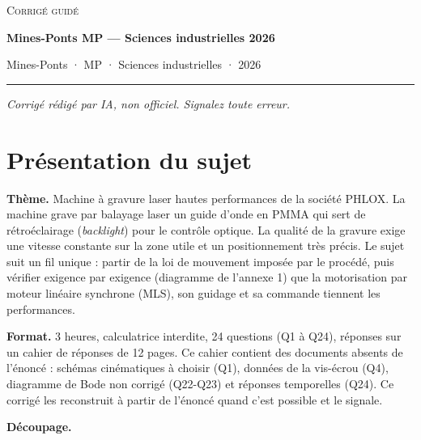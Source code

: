 \documentclass[11pt,a4paper]{article}
\begin{document}
\thispagestyle{plain}
\begin{center}
  {\small\scshape Corrigé guidé}\par\smallskip
  {\LARGE\bfseries Mines-Ponts MP — Sciences industrielles 2026\par}\medskip
  {\large Mines-Ponts · MP · Sciences industrielles · 2026\par}
\end{center}
\vspace{2pt}\hrule\vspace{8pt}

\emph{Corrigé rédigé par IA, non officiel. Signalez toute erreur.}

\hypertarget{pruxe9sentation-du-sujet}{%
\section{Présentation du sujet}\label{pruxe9sentation-du-sujet}}

\textbf{Thème.} Machine à gravure laser hautes performances de la société PHLOX. La machine grave par balayage laser un guide d'onde en PMMA qui sert de rétroéclairage (\emph{backlight}) pour le contrôle optique. La qualité de la gravure exige une vitesse constante sur la zone utile et un positionnement très précis. Le sujet suit un fil unique : partir de la loi de mouvement imposée par le procédé, puis vérifier exigence par exigence (diagramme de l'annexe 1) que la motorisation par moteur linéaire synchrone (MLS), son guidage et sa commande tiennent les performances.

\textbf{Format.} 3 heures, calculatrice interdite, 24 questions (Q1 à Q24), réponses sur un cahier de réponses de 12 pages. Ce cahier contient des documents absents de l'énoncé : schémas cinématiques à choisir (Q1), données de la vis-écrou (Q4), diagramme de Bode non corrigé (Q22-Q23) et réponses temporelles (Q24). Ce corrigé les reconstruit à partir de l'énoncé quand c'est possible et le signale.

\textbf{Découpage.}
\end{document}
